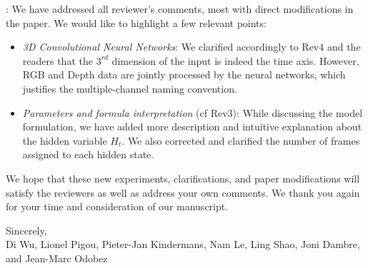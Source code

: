 \documentclass[12pt]{article}
\begin{document}
: We have addressed all reviewer's comments, most with direct modifications in the paper. We would like to
highlight a few relevant points:
\begin{itemize}
%
 \item {\em 3D Convolutional Neural Networks}: We clarified accordingly to Rev4 and the readers that the $3^{rd}$ dimension of the input is indeed the time axis. However, RGB and Depth data are jointly processed by the neural networks, which justifies the multiple-channel naming convention.
%
 \item {\em Parameters and formula interpretation} (cf Rev3): While discussing the model formulation, we have added more description and intuitive explanation about the hidden variable $H_t$. We also corrected and clarified the number of frames assigned to each hidden state.
\end{itemize}
We hope that these new experiments, clarifications, and paper modifications will satisfy the reviewers as well as address your own comments. We thank you again for your time and consideration of our manuscript.




%
\noindent Sincerely,\\[3mm]
Di Wu, Lionel Pigou, Pieter-Jan Kindermans, Nam Le, Ling Shao, Joni Dambre, and Jean-Marc Odobez
%
 


 
 
\end{document}
